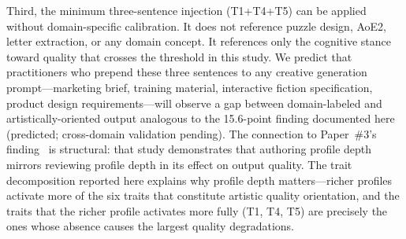 Third, the minimum three-sentence injection (T1+T4+T5) can be applied without domain-specific calibration. It does not reference puzzle design, AoE2, letter extraction, or any domain concept. It references only the cognitive stance toward quality that crosses the threshold in this study. We predict that practitioners who prepend these three sentences to any creative generation prompt---marketing brief, training material, interactive fiction specification, product design requirements---will observe a gap between domain-labeled and artistically-oriented output analogous to the 15.6-point finding documented here (predicted; cross-domain validation pending). The connection to Paper~\#3's finding~\cite{dellaLibera2025panel} is structural: that study demonstrates that authoring profile depth mirrors reviewing profile depth in its effect on output quality. The trait decomposition reported here explains why profile depth matters---richer profiles activate more of the six traits that constitute artistic quality orientation, and the traits that the richer profile activates more fully (T1, T4, T5) are precisely the ones whose absence causes the largest quality degradations.
